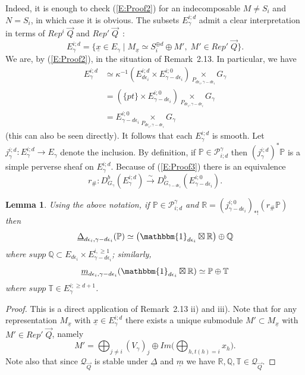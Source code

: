 \documentclass[a4paper,10pt]{amsart}
\def\QQ{\mathcal{Q}_{\vec{Q}}}
\newtheorem{lem}[theo]{Lemma}
\numberwithin{equation}{section}
\begin{document}
Indeed, it is enough to check (\ref{E:Proof2}) for an indecomposable $M \neq S_i$ and $N=S_i$, in which case it is obvious.
The subsets $E_{\gamma}^{i;d}$ admit a clear interpretation in terms of $Rep^i\;\vec{Q}$ and $Rep'\;\vec{Q}$~:
$$E_{\gamma}^{i;d}=\big\{ \underline{x} \in E_{\gamma}\;|\; M_{\underline{x}} \simeq S_i^{\oplus d} \oplus M', \; M' \in Rep'\;\vec{Q}\big\}.$$
We are, by (\ref{E:Proof2}), in the situation of Remark~2.13. In particular, we have 
\begin{equation}\label{E:Proof3}
\begin{split}
E_{\gamma}^{i;d} &\simeq \kappa^{-1}(E^{i;d}_{d\epsilon_i} \times E^{i;0}_{\gamma-d\epsilon_i}) \underset{P_{d\epsilon_i, \gamma-d\epsilon_i}}{\times}G_{\gamma}\\
&=(\{pt\} \times E^{i;0}_{\gamma-d\epsilon_i}) \underset{P_{d\epsilon_i, \gamma-d\epsilon_i}}{\times}G_{\gamma} \\
&=E^{i;0}_{\gamma-d\epsilon_i} \underset{P_{d\epsilon_i, \gamma-d\epsilon_i}}{\times}G_{\gamma}
\end{split}
\end{equation}
(this can also be seen directly). It follows that each $E^{i;d}_{\gamma}$ is smooth. Let $j_{\gamma}^{i;d}: E_{\gamma}^{i;d} \to E_{\gamma}$ denote the inclusion. By definition, if $\mathbb{P} \in \mathcal{P}_{i;d}^{\gamma}$ then $(j_{\gamma}^{i;d})^*\mathbb{P}$ is a simple perverse sheaf on $E^{i;d}_{\gamma}$. Because of (\ref{E:Proof3}) there is an equivalence
$$r_{\#}: D^b_{G_{\gamma}}(E^{i;d}_{\gamma}) \stackrel{\sim}{\to} D^b_{G_{\gamma-d\epsilon_i}}(E^{i;0}_{\gamma-d\epsilon_i}).$$

\vspace{.1in}

\begin{lem}\label{L:Proofkey} Using the above notation, if $\mathbb{P} \in \mathcal{P}^{\gamma}_{i;d}$ and $\mathbb{R}=(j_{\gamma-d\epsilon_i}^{i;0})_{*!}(r_{\#}\mathbb{P})$ then
\begin{equation}\label{E:Proof4}
\underline{\Delta}_{d\epsilon_i, \gamma-d\epsilon_i}(\mathbb{P}) \simeq \big(\mathbbm{1}_{d\epsilon_i} \boxtimes \mathbb{R}\big) \oplus \mathbb{Q}
\end{equation}
where $supp\; \mathbb{Q} \subset E_{d\epsilon_i} \times E_{\gamma-d\epsilon_i}^{i, \geq 1}$; similarly,
\begin{equation}\label{E:Proof5}
\underline{m}_{d\epsilon_i, \gamma-d\epsilon_i}(\mathbbm{1}_{d\epsilon_i} \boxtimes  \mathbb{R}) \simeq \mathbb{P} \oplus \mathbb{T}
\end{equation}
where $supp\;\mathbb{T} \in E_{\gamma}^{i;\geq d+1}$.
\end{lem}
\begin{proof} This is a direct application of Remark~2.13 ii) and iii). Note that for any representation $M_{\underline{x}}$ with $\underline{x} \in E_{\gamma}^{i;d}$ there exists a unique submodule $M' \subset M_{\underline{x}}$ with $M' \in Rep'\;\vec{Q}$, namely
$$M'=\bigoplus_{j \neq i} (V_{\gamma})_j \oplus Im\big( \bigoplus_{h, t(h)=i} x_h \big).$$
Note also that since $\QQ$ is stable under $\underline{\Delta}$ and $\underline{m}$ we have $\mathbb{R}, \mathbb{Q}, \mathbb{T} \in \QQ$.
\end{proof}
\end{document}
